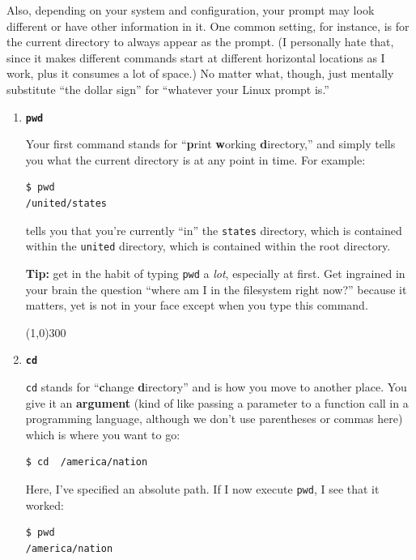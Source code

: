Also, depending on your system and configuration, your prompt may look
different or have other information in it. One common setting, for instance,
is for the current directory to always appear as the prompt. (I personally
hate that, since it makes different commands start at different horizontal
locations as I work, plus it consumes a lot of space.) No matter what, though,
just mentally substitute ``the dollar sign'' for ``whatever your Linux prompt
is.''

\newcommand{\bigline}{\vspace{-.3in} \begin{center} \line(1,0){300} \end{center}}


\begin{enumerate}
\itemsep.1em
\item \textbf{\texttt{pwd}}

Your first command stands for ``\textbf{p}rint \textbf{w}orking
\textbf{d}irectory,'' and simply tells you what the current directory is at any
point in time. For example:

\begin{Verbatim}[fontsize=\small]
$ pwd
/united/states
\end{Verbatim}

tells you that you're currently ``in'' the \texttt{states} directory, which is
contained within the \texttt{united} directory, which is contained within the
root directory.

\textbf{Tip:} get in the habit of typing \texttt{pwd} a \textit{lot},
especially at first. Get ingrained in your brain the question ``where am I in
the filesystem right now?'' because it matters, yet is not in your face except
when you type this command.

\bigline
\item \textbf{\texttt{cd}}

\texttt{cd} stands for ``\textbf{c}hange \textbf{d}irectory'' and is how you
move to another place. You give it an \textbf{argument} (kind of like passing
a parameter to a function call in a programming language, although we don't
use parentheses or commas here) which is where you want to go:

\begin{Verbatim}[fontsize=\small]
$ cd  /america/nation
\end{Verbatim}

Here, I've specified an absolute path. If I now execute \texttt{pwd}, I see
that it worked:
\begin{Verbatim}[fontsize=\small]
$ pwd
/america/nation
\end{Verbatim}


\end{enumerate}
